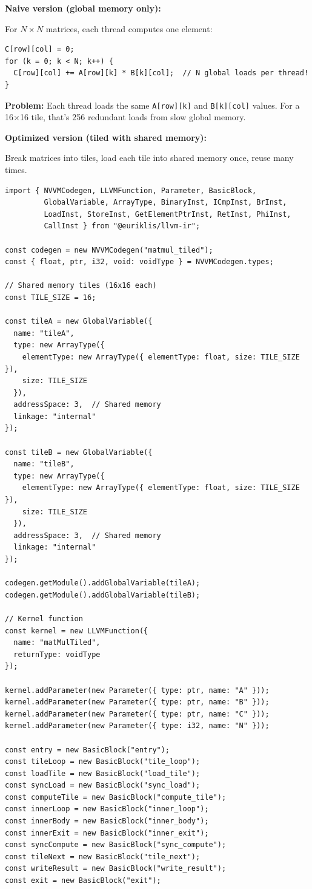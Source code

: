 \documentclass[11pt]{article}
\begin{document}
\textbf{Naive version (global memory only):}

For \(N \times N\) matrices, each thread computes one element:
\begin{lstlisting}[style=ts]
C[row][col] = 0;
for (k = 0; k < N; k++) {
  C[row][col] += A[row][k] * B[k][col];  // N global loads per thread!
}
\end{lstlisting}

\textbf{Problem:} Each thread loads the same \texttt{A[row][k]} and \texttt{B[k][col]} values. For a 16×16 tile, that's 256 redundant loads from slow global memory.

\textbf{Optimized version (tiled with shared memory):}

Break matrices into tiles, load each tile into shared memory once, reuse many times.

\begin{lstlisting}[style=ts]
import { NVVMCodegen, LLVMFunction, Parameter, BasicBlock,
         GlobalVariable, ArrayType, BinaryInst, ICmpInst, BrInst,
         LoadInst, StoreInst, GetElementPtrInst, RetInst, PhiInst,
         CallInst } from "@euriklis/llvm-ir";

const codegen = new NVVMCodegen("matmul_tiled");
const { float, ptr, i32, void: voidType } = NVVMCodegen.types;

// Shared memory tiles (16x16 each)
const TILE_SIZE = 16;

const tileA = new GlobalVariable({
  name: "tileA",
  type: new ArrayType({
    elementType: new ArrayType({ elementType: float, size: TILE_SIZE }),
    size: TILE_SIZE
  }),
  addressSpace: 3,  // Shared memory
  linkage: "internal"
});

const tileB = new GlobalVariable({
  name: "tileB",
  type: new ArrayType({
    elementType: new ArrayType({ elementType: float, size: TILE_SIZE }),
    size: TILE_SIZE
  }),
  addressSpace: 3,  // Shared memory
  linkage: "internal"
});

codegen.getModule().addGlobalVariable(tileA);
codegen.getModule().addGlobalVariable(tileB);

// Kernel function
const kernel = new LLVMFunction({
  name: "matMulTiled",
  returnType: voidType
});

kernel.addParameter(new Parameter({ type: ptr, name: "A" }));
kernel.addParameter(new Parameter({ type: ptr, name: "B" }));
kernel.addParameter(new Parameter({ type: ptr, name: "C" }));
kernel.addParameter(new Parameter({ type: i32, name: "N" }));

const entry = new BasicBlock("entry");
const tileLoop = new BasicBlock("tile_loop");
const loadTile = new BasicBlock("load_tile");
const syncLoad = new BasicBlock("sync_load");
const computeTile = new BasicBlock("compute_tile");
const innerLoop = new BasicBlock("inner_loop");
const innerBody = new BasicBlock("inner_body");
const innerExit = new BasicBlock("inner_exit");
const syncCompute = new BasicBlock("sync_compute");
const tileNext = new BasicBlock("tile_next");
const writeResult = new BasicBlock("write_result");
const exit = new BasicBlock("exit");


\end{lstlisting}
\end{document}
